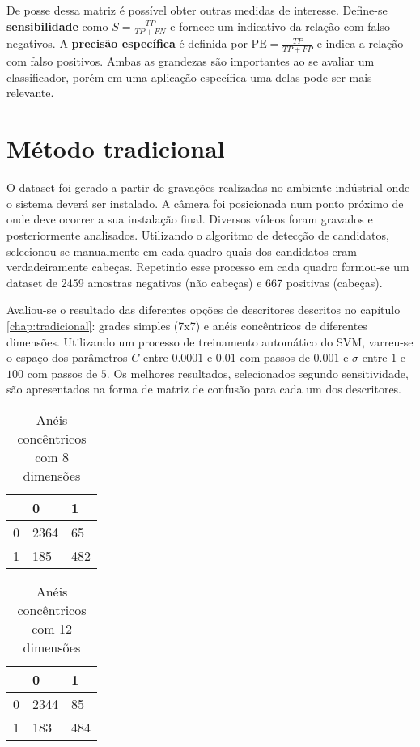 De posse dessa matriz é possível obter outras medidas de interesse. Define-se \textbf{sensibilidade} como $S = \frac{TP}{TP+FN}$ e fornece um indicativo da relação com falso negativos. A \textbf{precisão específica} é definida por $\text{PE}=\frac{TP}{TP+FP}$ e indica a relação com falso positivos. Ambas as grandezas são importantes ao se avaliar um classificador, porém em uma aplicação específica uma delas pode ser mais relevante.

\section{Método tradicional}
O dataset foi gerado a partir de gravações realizadas no ambiente indústrial onde o sistema deverá ser instalado. A câmera foi posicionada num ponto próximo de onde deve ocorrer a sua instalação final. Diversos vídeos foram gravados e posteriormente analisados. Utilizando o algoritmo de detecção de candidatos, selecionou-se manualmente em cada quadro quais dos candidatos eram verdadeiramente cabeças. Repetindo esse processo em cada quadro formou-se um dataset de 2459 amostras negativas (não cabeças) e 667 positivas (cabeças).

Avaliou-se o resultado das diferentes opções de descritores descritos no capítulo \ref{chap:tradicional}: grades simples (7x7) e anéis concêntricos de diferentes dimensões. Utilizando um processo de treinamento automático do SVM, varreu-se o espaço dos parâmetros $C$ entre $0.0001$ e $0.01$ com passos de $0.001$ e $\sigma$ entre $1$ e $100$ com passos de $5$. Os melhores resultados, selecionados segundo sensitividade, são apresentados na forma de matriz de confusão para cada um dos descritores.


\begin{table}[h]
\centering
\caption{Anéis concêntricos com 8 dimensões}
\begin{tabular}{l|l|l|}
\cline{2-3}
                        & 0 & 1 \\ \hline
\multicolumn{1}{|l|}{0} & 2364 & 65 \\ \hline
\multicolumn{1}{|l|}{1} & 185 & 482 \\ \hline
\end{tabular}
\end{table}

\begin{table}[h]
\centering
\caption{Anéis concêntricos com 12 dimensões}
\begin{tabular}{l|l|l|}
\cline{2-3}
                        & 0 & 1 \\ \hline
\multicolumn{1}{|l|}{0} & 2344 & 85 \\ \hline
\multicolumn{1}{|l|}{1} & 183 & 484 \\ \hline
\end{tabular}
\end{table}

